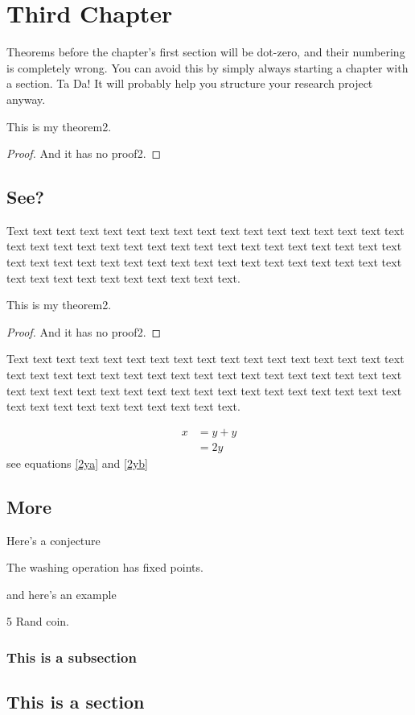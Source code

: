 \chapter{Third Chapter}

Theorems before the chapter's first section will be dot-zero, 
and their numbering is completely wrong. You can avoid this
by simply always starting a chapter with a section. Ta Da! 
It will probably help you structure your research project anyway. 

\begin{thm}[My Theorem2]
This is my theorem2.
\end{thm}
\begin{proof}
And it has no proof2.
\end{proof}

\section{See?}

Text text text text text text text text text text text text text text
text text text text text text text text text text text text text text
text text text text text text text text text text text text text text
text text text text text text text text text text text text text text
text text text text text.

\begin{thm}[My Theorem2]
This is my theorem2.
\end{thm}
\begin{proof}
And it has no proof2.
\end{proof}

Text text text text text text text text text text text text text text
text text text text text text text text text text text text text text
text text text text text text text text text text text text text text
text text text text text text text text text text text text text text
text text text text text.

\begin{align} %
\label{2ya}
x & = y + y\\
\label{2yb}
& = 2y
\end{align}
see equations \ref{2ya} and \ref{2yb}

\section{More}

Here's a conjecture
\begin{conj}
The washing operation has fixed points.
\end{conj}

and here's an example

\begin{exa}
5 Rand coin.
\end{exa}

\subsection{This is a subsection}

\section{This is a section}
